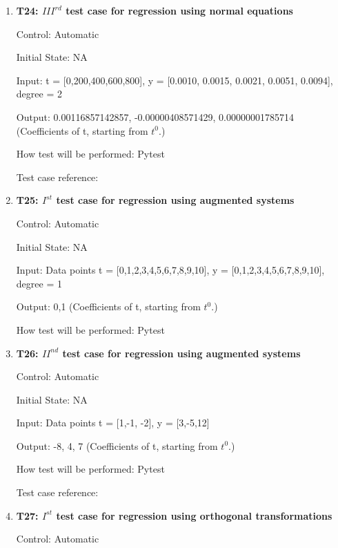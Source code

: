 \documentclass[12pt, titlepage]{article}
\begin{document}
\begin{enumerate}

\item{\textbf{T24: ${III}^{rd}$ test case for regression using normal equations 
}\\}

Control: Automatic

Initial State: NA

Input: t = [0,200,400,600,800], y = [0.0010, 0.0015, 0.0021, 0.0051, 0.0094], degree = 2

Output: 0.00116857142857, -0.00000408571429, 0.00000001785714 (Coefficients of t, starting from $t^{0}$.)

How test will be performed: Pytest

Test case reference:~\cite{RegNormal}\\



\item{\textbf{T25: $I^{st}$ test case for regression using augmented systems}\\}

Control: Automatic

Initial State: NA

Input: Data points t = [0,1,2,3,4,5,6,7,8,9,10], y = [0,1,2,3,4,5,6,7,8,9,10], degree = 1 

Output: 0,1 (Coefficients of t, starting from $t^{0}$.)

How test will be performed: Pytest\\

\item{\textbf{T26: ${II}^{nd}$ test case for regression using augmented 
systems}\\}

Control: Automatic

Initial State: NA

Input: Data points t = [1,-1, -2], y = [3,-5,12] 

Output: -8, 4, 7 (Coefficients of t, starting from $t^{0}$.)

How test will be performed: Pytest

Test case reference: \cite{RegAugmented}\\


\item{\textbf{T27: ${I}^{st}$ test case for regression using orthogonal 
transformations}\\}

Control: Automatic


\end{enumerate}
\end{document}

